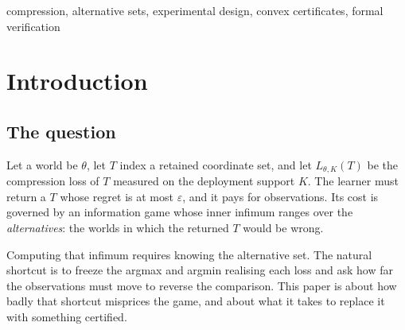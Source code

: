 \begin{abstract}
Supporting these: the alternative set is pinned exactly, as an \emph{equality} with a finite
union of polyhedron-intersect-halfspace pieces proved in both directions, with the strict
inequality handled by an explicit modulus rather than silently closed; certificates at two
levels, a regional KKT certificate and a dual over the whole query set, so ``optimal'' is
never shorthand for ``optimal within the family we searched''; and a learner that stops under
a certificate which is a weak-duality \emph{lower} bound, never a primal value.

The separation reaches sample complexity for the design itself. The learner that tracks an
exact surrogate optimum, with forced exploration at rate $1/\sqrt{s+1}$ and the true
likelihood-ratio stop, pays $\Omega(\log^{2}(1/\delta))$ samples, while the ideal learner,
defined and proved here, pays $\Theta(\log(1/\delta))$. This holds for the deployable learner
that re-solves the surrogate at its own estimate every round, not only for the surrogate's
optimum at the true world. Its oracle sees only the estimate, and the rounds in which the
estimate misleads it cost a constant in expectation. The measured panel is reported per confidence level under common random
numbers, and supports the implementation, not the asymptotics.
\end{abstract}

\begin{IEEEkeywords}
compression, alternative sets, experimental design, convex certificates, formal verification
\end{IEEEkeywords}

\section{Introduction}
\label{sec:intro}

\subsection{The question}

Let a world be $\theta$, let $T$ index a retained coordinate set, and let $L_{\theta,K}(T)$
be the compression loss of $T$ measured on the deployment support $K$. The learner must
return a $T$ whose regret is at most $\varepsilon$, and it pays for observations. Its cost
is governed by an information game whose inner infimum ranges over the \emph{alternatives}:
the worlds in which the returned $T$ would be wrong.

Computing that infimum requires knowing the alternative set. The natural shortcut is to
freeze the argmax and argmin realising each loss and ask how far the observations must move
to reverse the comparison. This paper is about how badly that shortcut misprices the game,
and about what it takes to replace it with something certified.

